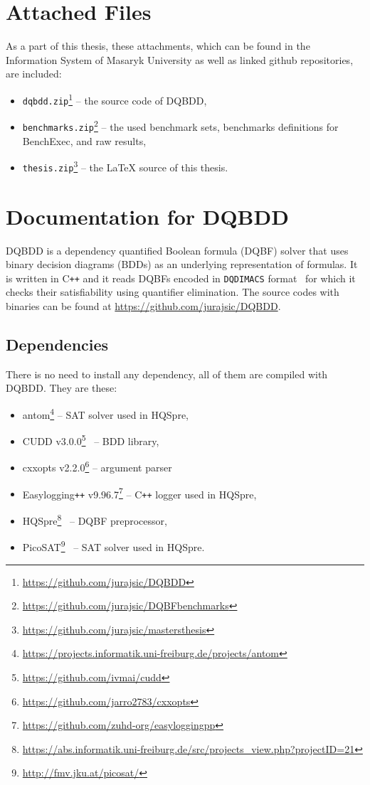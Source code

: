 \documentclass[
  digital, %
  color,
  twoside, %
  table,   %
  nolof,     %
  nolot,     %
]{fithesis3}
\theoremstyle{definition}
\theoremstyle{remark}
\newcommand{\DQDIMACS}[0]{\texttt{DQDIMACS}}
\newcommand{\Cplusplus}{C\texttt{++}}
\begin{document}
\begingroup
\setlength{\emergencystretch}{8em}
\printbibliography[heading=bibintoc]
\endgroup


\appendix %

\chapter{Attached Files}
\label{appendix:attachments}
As a part of this thesis, these attachments, which can be found in the Information System of Masaryk University as well as linked github repositories, are included:
\begin{itemize}
    \item \verb|dqbdd.zip|\footnote{\url{https://github.com/jurajsic/DQBDD}} -- the source code of DQBDD,
    \item \verb|benchmarks.zip|\footnote{\url{https://github.com/jurajsic/DQBFbenchmarks}} -- the used benchmark sets, benchmarks definitions for BenchExec, and raw results,
    \item \verb|thesis.zip|\footnote{\url{https://github.com/jurajsic/mastersthesis}} -- the \LaTeX{} source of this thesis.
\end{itemize}

\chapter{Documentation for DQBDD}
\label{appendix:DQBDD}
DQBDD is a dependency quantified Boolean formula (DQBF) solver that uses binary decision diagrams (BDDs) as an underlying representation of formulas. It is written in \Cplusplus{} and it reads DQBFs encoded in \DQDIMACS{} format~\cite{iDQandDQDIMACS} for which it checks their satisfiability using quantifier elimination. The source codes with binaries can be found at \url{https://github.com/jurajsic/DQBDD}. 


\section{Dependencies}
There is no need to install any dependency, all of them are compiled with DQBDD. They are these:
\begin{itemize}
  \item antom\footnote{\url{https://projects.informatik.uni-freiburg.de/projects/antom}} -- SAT solver used in HQSpre,
  \item CUDD v3.0.0\footnote{\url{https://github.com/ivmai/cudd}}~\cite{CUDD} -- BDD library,
  \item cxxopts v2.2.0\footnote{\url{https://github.com/jarro2783/cxxopts}} -- argument parser
  \item Easylogging\texttt{++} v9.96.7\footnote{\url{https://github.com/zuhd-org/easyloggingpp}} -- \Cplusplus{} logger used in HQSpre,
  \item HQSpre\footnote{\url{https://abs.informatik.uni-freiburg.de/src/projects_view.php?projectID=21}}~\cite{HQSpreJournal} -- DQBF preprocessor,
  \item PicoSAT\footnote{\url{http://fmv.jku.at/picosat/}}~\cite{PicoSAT} -- SAT solver used in HQSpre.
\end{itemize}
\end{document}
